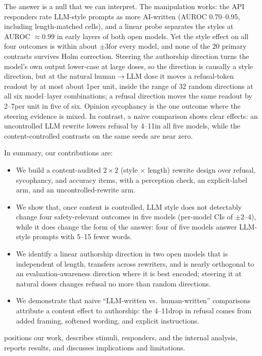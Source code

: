 The answer is a null that we can interpret.
The manipulation works: the API responders rate LLM-style prompts as more AI-written (AUROC 0.70--0.95, including length-matched cells), and a linear probe separates the styles at AUROC $\approx0.99$ in early layers of both open models.
Yet the style effect on all four outcomes is within about $\pm3$\pp for every model, and none of the 20 primary contrasts survives Holm correction.
Steering the authorship direction turns the model's own output lower-case at large doses, so the direction is causally a style direction, but at the natural human$\rightarrow$LLM dose it moves a refusal-token readout by at most about 1\pp per unit, inside the range of 32 random directions at all six model--layer combinations; a refusal direction moves the same readout by 2--7\pp per unit in five of six.
Opinion sycophancy is the one outcome where the steering evidence is mixed.
In contrast, a naive comparison shows clear effects: an uncontrolled LLM rewrite lowers refusal by 4--11\pp in all five models, while the content-controlled contrasts on the same seeds are near zero.

In summary, our contributions are:
\begin{itemize}[leftmargin=*,itemsep=0pt,topsep=0pt]
    \item We build a content-audited $2\times2$ (style $\times$ length) rewrite design over refusal, sycophancy, and accuracy items, with a perception check, an explicit-label arm, and an uncontrolled-rewrite arm.
    \item We show that, once content is controlled, LLM style does not detectably change four safety-relevant outcomes in five models (per-model CIs of $\pm2$--$4$\pp), while it does change the form of the answer: four of five models answer LLM-style prompts with 5--15 fewer words.
    \item We identify a linear authorship direction in two open models that is independent of length, transfers across rewriters, and is nearly orthogonal to an evaluation-awareness direction where it is best encoded; steering it at natural doses changes refusal no more than random directions.
    \item We demonstrate that naive ``LLM-written vs.\ human-written'' comparisons attribute a content effect to authorship: the 4--11\pp drop in refusal comes from added framing, softened wording, and explicit instructions.
\end{itemize}

 positions our work,  describes stimuli, responders, and the internal analysis,  reports results, and  discusses implications and limitations.
